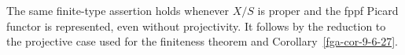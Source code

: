 \begin{remark}\label{fga-rem-9-6-28}
The same finite-type assertion holds whenever $X/S$ is proper and the fppf Picard
functor is represented, even without projectivity.  It follows by the reduction
to the projective case used for the finiteness theorem and Corollary~\ref{fga-cor-9-6-27}.
\end{remark}
